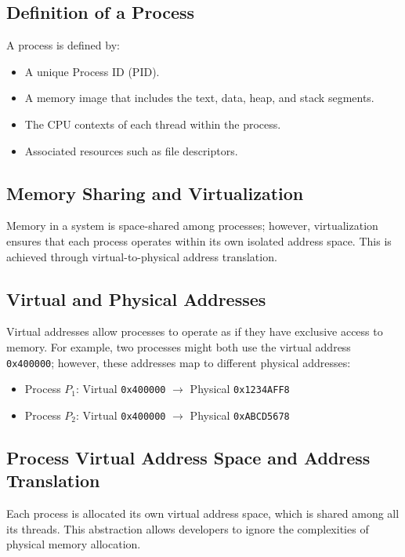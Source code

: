\subsection{Definition of a Process}
\begin{definition}[Process]
A process is defined by:
\begin{itemize}
    \item A unique Process ID (PID).
    \item A memory image that includes the text, data, heap, and stack segments.
    \item The CPU contexts of each thread within the process.
    \item Associated resources such as file descriptors.
\end{itemize}
\end{definition}

\subsection{Memory Sharing and Virtualization}
\begin{definition}
Memory in a system is space-shared among processes; however, virtualization ensures that each process operates within its own isolated address space. This is achieved through virtual-to-physical address translation.
\end{definition}

\subsection{Virtual and Physical Addresses}
Virtual addresses allow processes to operate as if they have exclusive access to memory. For example, two processes might both use the virtual address \texttt{0x400000}; however, these addresses map to different physical addresses:
\begin{itemize}
    \item Process \( P_1 \): Virtual \texttt{0x400000} \(\rightarrow\) Physical \texttt{0x1234AFF8}
    \item Process \( P_2 \): Virtual \texttt{0x400000} \(\rightarrow\) Physical \texttt{0xABCD5678}
\end{itemize}

\subsection{Process Virtual Address Space and Address Translation}
\begin{definition}
Each process is allocated its own virtual address space, which is shared among all its threads. This abstraction allows developers to ignore the complexities of physical memory allocation.
\end{definition}

